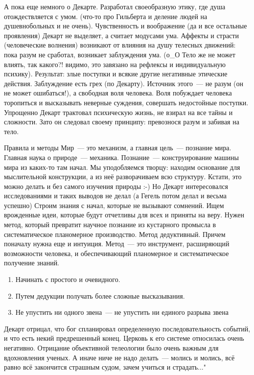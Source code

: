 А пока еще немного о Декарте.
Разработал своеобразную этику, где душа отождествляется с умом. (что-то про Гильберта и деление людей на душевнобольных и не очень). Чувственность и воображение (да и все остальные проявления) Декарт не выделяет, а считает модусами ума. Аффекты и страсти (человеческие волнения) возникают от влияния на душу телесных движений: пока разум не сработал, возникает заблуждения ума. (о\_О Тело же не может влиять, так какого?! видимо, это завязано на рефлексы и индивидуальную психику). Результат: злые поступки и всякие другие негативные этические действия. Заблуждение есть грех (по Декарту). Источник этого~--- не разум (он не может ошибаться!), а свободная воля человека. Воля побуждает человека торопиться и высказывать неверные суждения, совершать недостойные поступки. Упрощенно Декарт трактовал психическую жизнь, не взирал на все тайны и сложности. Зато он следовал своему принципу: превознося разум и забивая на тело.

Правила и методы
Мир~--- это механизм, а главная цель~--- познание мира. Главная наука о природе~--- механика. Познание~--- конструирование машины мира из каких-то там начал. Мы уподобляемся творцу: находим основание для мыслительной конструкции, а из неё разворачиваем всю структуру. Кстати, это можно делать и без самого изучения природы :-) Но Декарт интересовался исследованиями и таких выводов не делал (а Гегель потом делал и весьма успешно)
Строим знания с начал, которые не вызывают сомнений. Ищем врожденные идеи, которые будут отчетливы для всех и приняты на веру. Нужен метод, который превратит научное познание из кустарного промысла в систематическое планомерное производство. Метод дедуктивный. Причем поначалу нужна еще и интуиция. Метод~--- это инструмент, расширяющий возможности человека, и обеспечивающий планомерное и систематическое получение знаний.
\begin{enumerate}
	\item Начинать с простого и очевидного. 
	\item Путем дедукции получать более сложные высказывания. 
	\item Не упустить ни одного звена~--- не упустить ни единого разрыва звена
\end{enumerate}

Декарт отрицал, что бог спланировал определенную последовательность событий, и что есть некий предрешенный конец. Церковь к его системе относилась очень негативно. Отрицание объективной телеологии было очень важным для вдохновления ученых. А иначе ниче не надо делать~--- молись и молись, всё равно всё закончится страшным судом, зачем учиться и страдать..."

